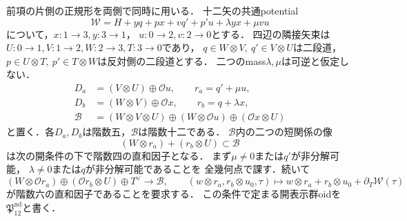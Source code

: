 前項の片側の正規形を両側で同時に用いる．
十二矢の共通potential
\[
 \mathcal W=H+yq+px+vq'+p'u+\lambda yx+\mu vu
 \tag{2M}\label{eq:qa-two-mass-potential}
\]
について，$x:1\to3,y:3\to1$，
$u:0\to2,v:2\to0$とする．
四辺の隣接矢束は$U:0\to1,V:1\to2,
W:2\to3,T:3\to0$であり，
$q\in W\otimes V,\ q'\in V\otimes U$は二段道，
$p\in U\otimes T,\ p'\in T\otimes W$は反対側の二段道とする．
二つのmass$\lambda,\mu$は可逆と仮定しない．
\[
 \begin{split}
  D_a&=(V\otimes U)\oplus\mathcal O u,\qquad
       r_a=q'+\mu u,\\
  D_b&=(W\otimes V)\oplus\mathcal O x,\qquad
       r_b=q+\lambda x,\\
  \mathcal B&=(W\otimes V\otimes U)
              \oplus(W\otimes\mathcal O u)
              \oplus(\mathcal O x\otimes U)
 \end{split}
 \tag{PB}\label{eq:qa-two-mass-path-bundles}
\]
と置く．各$D_a,D_b$は階数五，$\mathcal B$は階数十二である．
$\mathcal B$内の二つの短関係の像
\[
 (W\otimes r_a)+(r_b\otimes U)\subset\mathcal B
\]
は次の開条件の下で階数四の直和因子となる．
まず$\mu\ne0$または$q'$が非分解可能，
$\lambda\ne0$または$q$が非分解可能であることを
全幾何点で課す．続いて
\[
 (W\otimes\mathcal O r_a)\oplus
 (\mathcal O r_b\otimes U)\oplus T^\vee
       \longrightarrow\mathcal B,\qquad
 (w\otimes r_a,r_b\otimes u_0,\tau)\longmapsto
 w\otimes r_a+r_b\otimes u_0+
             \partial_T\mathcal W(\tau)
 \tag{6R}\label{eq:qa-two-mass-six-relations}
\]
が階数六の直和因子であることを要求する．
この条件で定まる開表示群oidを
$\mathfrak P_{12}^{\mathrm{nd}}$と書く．

